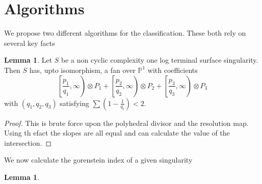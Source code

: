 \documentclass[11pt]{amsart}
\theoremstyle{definition}
\theoremstyle{definition}
\theoremstyle{definition}
\theoremstyle{definition}
\theoremstyle{definition}
\newtheorem{lem}[thm]{Lemma}
\theoremstyle{definition}
\theoremstyle{definition}
\begin{document}
\begin{comment}
\begin{figure}[htbp]
\psset{unit=0.95cm}
\begin{pspicture}(0,-8)(12,0)
\psframe[linecolor=white](0.5,-10)(3.5,-1.5)

\psline{-}(4,-1.5)(10.5, -1.5)



\psline{-}(6.75,-0.75)(4.5, -3)
\psline[linestyle = dashed]{-}(8.25,-0.75)(6, -3)
\psline{-}(9.75,-0.75)(7.5, -3)
\psline[linestyle = dashed]{-}(5, -2)(5, -5)
\psline{-}(6.5, -2)(6.5, -5)
\psline[linestyle = dashed]{-}(8, -2)(8, -5)
\psline{-}(4.5, -3.75)(6.75,-6.75)
\psline[linestyle = dashed]{-}(6, -3.75)(8.25,-6.75)
\psline{-}(7.5, -3.75)(9.75,-6.75)

\psline{-}(4,-6)(10.5, -6)
\end{pspicture}

\caption{The minimal resolution of the above log del Pezzo. Here the dark lines indicate -2 curves and the dotted lines indicate -1 curves.}

\end{figure}
\end{comment}

\section{Algorithms}
We propose two different algorithms for the classification. These both rely on several key facts

\begin{lem}{\cite{S}}
Let $S$ be a non cyclic complexity one log terminal surface singularity. Then $S$ has, upto isomorphism, a fan over $\mathbb{P}^1$ with coefficients
\[
\left[\frac{p_1}{q_1}, \infty \right) \otimes P_1 + \left[ \frac{p_2}{q_2}, \infty \right) \otimes P_2 + \left[ \frac{p_3}{q_3}, \infty \right) \otimes P_3
\]
with $(q_1, q_2, q_3)$ satisfying $\sum(1 - \frac{1}{q_i}) < 2$.
\end{lem}
\begin{proof}
This is brute force upon the polyhedral divisor and the resolution map. Using th efact the slopes are all equal and can calculate the value of the intersection.
\end{proof}

We now calculate the gorenstein index of a given singularity 
\begin{lem}

\end{lem}
\end{document}
